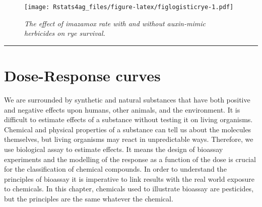 \documentclass[letterpaper,]{book}
\newenvironment{Shaded}{\begin{snugshade}}{\end{snugshade}}
\newcommand{\DataTypeTok}[1]{\textcolor[rgb]{0.13,0.29,0.53}{#1}}
\newcommand{\DecValTok}[1]{\textcolor[rgb]{0.00,0.00,0.81}{#1}}
\newcommand{\FloatTok}[1]{\textcolor[rgb]{0.00,0.00,0.81}{#1}}
\newcommand{\KeywordTok}[1]{\textcolor[rgb]{0.13,0.29,0.53}{\textbf{#1}}}
\newcommand{\NormalTok}[1]{#1}
\newcommand{\OperatorTok}[1]{\textcolor[rgb]{0.81,0.36,0.00}{\textbf{#1}}}
\newcommand{\StringTok}[1]{\textcolor[rgb]{0.31,0.60,0.02}{#1}}
\begin{document}
\begin{Shaded}
\end{Shaded}

\begin{figure}
\centering
\texttt{[image: Rstats4ag\_files/figure-latex/figlogisticrye-1.pdf]}
\caption{\label{fig:figlogisticrye}\emph{The effect of imazamox rate with and without auxin-mimic herbicides on rye survival.}}
\end{figure}

\begin{center}\rule{0.5\linewidth}{0.5pt}\end{center}

\hypertarget{dose-response-curves}{%
\chapter{Dose-Response curves}\label{dose-response-curves}}

We are surrounded by synthetic and natural substances that have both positive and negative effects upon humans, other animals, and the environment. It is difficult to estimate effects of a substance without testing it on living organisms. Chemical and physical properties of a substance can tell us about the molecules themselves, but living organisms may react in unpredictable ways. Therefore, we use biological assay to estimate effects. It means the design of bioassay experiments and the modelling of the response as a function of the dose is crucial for the classification of chemical compounds. In order to understand the principles of bioassay it is imperative to link results with the real world exposure to chemicals. In this chapter, chemicals used to illustrate bioassay are pesticides, but the principles are the same whatever the chemical.
\end{document}
